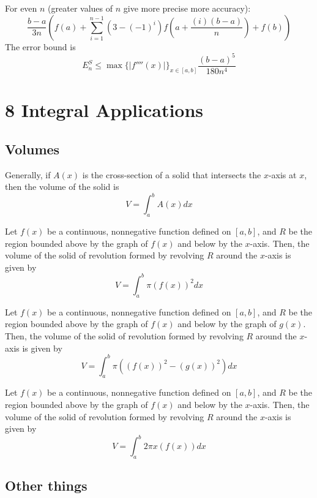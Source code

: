 \begin{definition}
  For even $n$ (greater values of $n$ give more precise more accuracy):
  \[
    \frac{b-a}{3n} \left(f(a) + \sum_{i=1}^{n-1} (3 - (-1)^i) f\left(a + \frac{(i)(b-a)}{n}\right) + f(b)\right)
  \]
  The error bound is
  \[
    E_n^S \leq \max\{|f''''(x)|\}_{x \in [a, b]} \frac{(b-a)^5}{180n^4}
  \]
\end{definition}

\section*{8 Integral Applications}

\subsection*{Volumes}

Generally, if $A(x)$ is the cross-section of a solid that intersects the $x$-axis at $x$, then the volume of the solid is
\[
  V = \int_a^b A(x) dx
\]

\begin{theorem} Let $f(x)$ be a continuous, nonnegative function defined on $[a, b]$, and $R$ be the region bounded above by the graph of $f(x)$ and below by the $x$-axis. Then, the volume of the solid of revolution formed by revolving $R$ around the $x$-axis is given by
  \[
    V = \int_a^b \pi (f(x))^2 dx
  \]
\end{theorem}

\begin{theorem} Let $f(x)$ be a continuous, nonnegative function defined on $[a, b]$, and $R$ be the region bounded above by the graph of $f(x)$ and below by the graph of $g(x)$. Then, the volume of the solid of revolution formed by revolving $R$ around the $x$-axis is given by
  \[
    V = \int_a^b \pi ((f(x))^2 - (g(x))^2) dx
  \]
\end{theorem}

\begin{theorem} Let $f(x)$ be a continuous, nonnegative function defined on $[a, b]$, and $R$ be the region bounded above by the graph of $f(x)$ and below by the $x$-axis. Then, the volume of the solid of revolution formed by revolving $R$ around the $x$-axis is given by
  \[
    V = \int_a^b 2\pi x (f(x)) dx
  \]
\end{theorem}

\subsection*{Other things}

